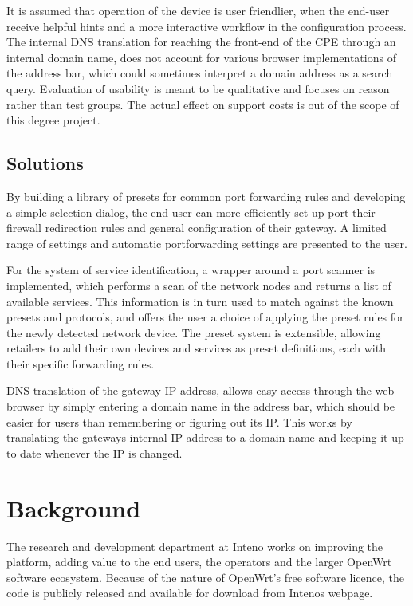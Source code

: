 \documentclass[g5paper,11pt]{kth-bcs}
\begin{document}
It is assumed that operation of the device is user friendlier, when the end-user receive helpful hints and a more interactive workflow in the configuration process.
The internal DNS translation for reaching the front-end of the CPE through an internal domain name, does not account for various browser implementations of the address bar, which could sometimes interpret a domain address as a search query.
Evaluation of usability is meant to be qualitative and focuses on reason rather than test groups.
The actual effect on support costs is out of the scope of this degree project.

\section{Solutions}
By building a library of presets for common port forwarding rules and developing a simple selection dialog, the end user can more efficiently set up port their firewall redirection rules and general configuration of their gateway.
A limited range of settings and automatic portforwarding settings are presented to the user.

For the system of service identification, a wrapper around a port scanner is implemented, which performs a scan of the network nodes and returns a list of available services.
This information is in turn used to match against the known presets and protocols, and offers the user a choice of applying the preset rules for the newly detected network device.
The preset system is extensible, allowing retailers to add their own devices and services as preset definitions, each with their specific forwarding rules.

DNS translation of the gateway IP address, allows easy access through the web browser by simply entering a domain name in the address bar, which should be easier for users than remembering or figuring out its IP.
This works by translating the gateways internal IP address to a domain name and keeping it up to date whenever the IP is changed.

\chapter{Background}

The research and development department at Inteno works on improving the platform, adding value to the end users, the operators and the larger OpenWrt software ecosystem.
Because of the nature of OpenWrt's free software licence\cite{gnu-license}, the code is publicly released and available for download from Intenos webpage.\cite{inteno_gpl}
\end{document}
